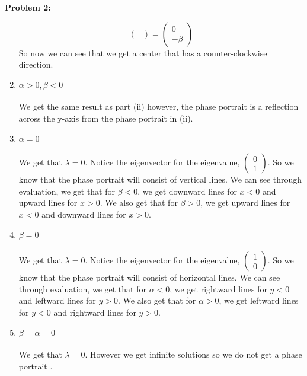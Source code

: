 \documentclass[11pt]{article}
\newenvironment{problem}[1]{\textbf{Problem #1: }}{\newpage}
\begin{document}
\begin{problem}{2}
\begin{enumerate}[label = (\roman*)]
\[\begin{pmatrix}
			\end{pmatrix} = \begin{pmatrix}
			0 \\ -\beta 
			\end{pmatrix}\]
			So now we can see that we get a center that has a counter-clockwise direction.
			\item \boldmath $\alpha > 0, \beta < 0$ \unboldmath
			\\ \\
			We get the same result as part (ii) however, the phase portrait is a reflection across the y-axis from the phase portrait in (ii).
			\newpage
			\item \boldmath $\alpha = 0$ \unboldmath
			\\ \\
			We get that $\lambda = 0$. Notice the eigenvector for the eigenvalue, $\begin{pmatrix}
				0 \\ 1
			\end{pmatrix}$.
			So we know that the phase portrait will consist of vertical lines.  We can see through evaluation, we get that for $\beta < 0$, we get downward lines for $x < 0$ and upward lines for $x > 0$.  We also get that for $\beta > 0$, we get upward lines for $x < 0$ and downward lines for $x > 0$.
			\item \boldmath $\beta = 0$ \unboldmath
			\\ \\
			We get that $\lambda = 0$. Notice the eigenvector for the eigenvalue, $\begin{pmatrix}
			1 \\ 0
			\end{pmatrix}$.
			So we know that the phase portrait will consist of horizontal lines.  We can see through evaluation, we get that for $\alpha < 0$, we get rightward lines for $y < 0$ and leftward lines for $y > 0$.  We also get that for $\alpha > 0$, we get leftward lines for $y < 0$ and rightward lines for $y > 0$.
			\item \boldmath $\beta = \alpha = 0$ \unboldmath
			\\ \\
			We get that $\lambda = 0$.  However we get infinite solutions so we do not get a phase portrait . 
		\end{enumerate}
	\end{problem}
\end{document}
